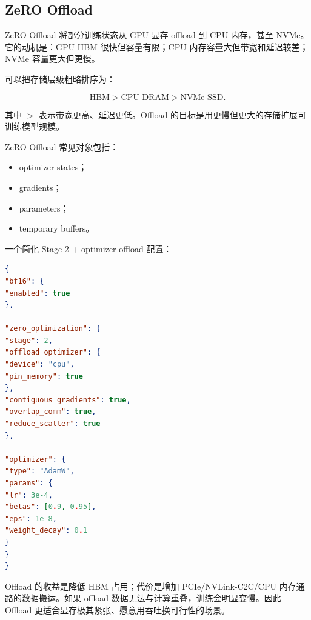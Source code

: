 \subsection{ZeRO Offload}
\label{subsec:zero-offload}

ZeRO Offload 将部分训练状态从 GPU 显存 offload 到 CPU 内存，甚至 NVMe。它的动机是：GPU HBM 很快但容量有限；CPU 内存容量大但带宽和延迟较差；NVMe 容量更大但更慢。

可以把存储层级粗略排序为：

\[
\text{HBM}
>
\text{CPU DRAM}
>
\text{NVMe SSD}.
\]

其中 $>$ 表示带宽更高、延迟更低。Offload 的目标是用更慢但更大的存储扩展可训练模型规模。

ZeRO Offload 常见对象包括：

\begin{itemize}
\item optimizer states；
\item gradients；
\item parameters；
\item temporary buffers。
\end{itemize}

一个简化 Stage 2 + optimizer offload 配置：

\begin{lstlisting}[language=json,caption={DeepSpeed ZeRO Offload 配置示例},label={lst:deepspeed-zero-offload-config}]
{
"bf16": {
"enabled": true
},

"zero_optimization": {
"stage": 2,
"offload_optimizer": {
"device": "cpu",
"pin_memory": true
},
"contiguous_gradients": true,
"overlap_comm": true,
"reduce_scatter": true
},

"optimizer": {
"type": "AdamW",
"params": {
"lr": 3e-4,
"betas": [0.9, 0.95],
"eps": 1e-8,
"weight_decay": 0.1
}
}
}
\end{lstlisting}

Offload 的收益是降低 HBM 占用；代价是增加 PCIe/NVLink-C2C/CPU 内存通路的数据搬运。如果 offload 数据无法与计算重叠，训练会明显变慢。因此 Offload 更适合显存极其紧张、愿意用吞吐换可行性的场景。

